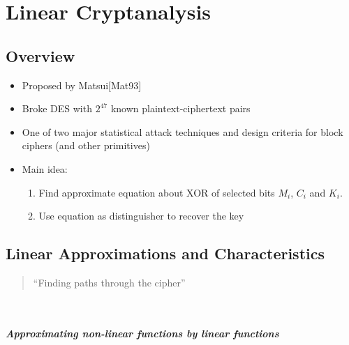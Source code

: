\chapter{Linear Cryptanalysis}


\section*{Overview}
\begin{itemize}
	\item Proposed by Matsui[Mat93]
	\item Broke DES with $2^{47}$ known plaintext-ciphertext pairs
	\item One of two major statistical attack techniques and design criteria for block ciphers (and other primitives)
\end{itemize}
\vspace{4pt}
\begin{itemize}
	\item Main idea:
\begin{enumerate}
	\item Find approximate equation about XOR of selected bits $M_i$, $C_i$ and $K_i$.
	\item Use equation as distinguisher to recover the key
\end{enumerate}
\end{itemize}


\section{Linear Approximations and Characteristics}
\begin{quote}
``Finding paths through the cipher''
\end{quote}\
\paragraph{Approximating non-linear functions by linear functions}

